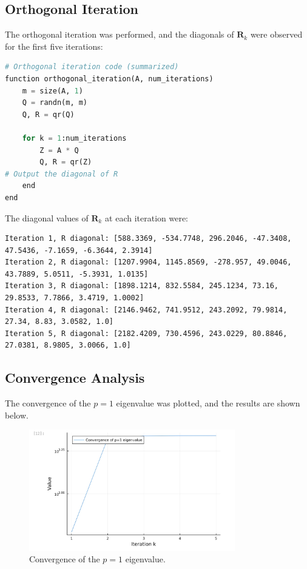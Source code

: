 \documentclass{article}
\begin{document}
\subsection{Orthogonal Iteration}
The orthogonal iteration was performed, and the diagonals of $\mathbf{R}_k$ were observed for the first five iterations:

\begin{lstlisting}[language=Python]
# Orthogonal iteration code (summarized)
function orthogonal_iteration(A, num_iterations)
    m = size(A, 1)
    Q = randn(m, m)
    Q, R = qr(Q)

    for k = 1:num_iterations
        Z = A * Q
        Q, R = qr(Z)
# Output the diagonal of R
    end
end
\end{lstlisting}

The diagonal values of $\mathbf{R}_k$ at each iteration were:

\begin{verbatim}
Iteration 1, R diagonal: [588.3369, -534.7748, 296.2046, -47.3408, 47.5436, -7.1659, -6.3644, 2.3914]
Iteration 2, R diagonal: [1207.9904, 1145.8569, -278.957, 49.0046, 43.7889, 5.0511, -5.3931, 1.0135]
Iteration 3, R diagonal: [1898.1214, 832.5584, 245.1234, 73.16, 29.8533, 7.7866, 3.4719, 1.0002]
Iteration 4, R diagonal: [2146.9462, 741.9512, 243.2092, 79.9814, 27.34, 8.83, 3.0582, 1.0]
Iteration 5, R diagonal: [2182.4209, 730.4596, 243.0229, 80.8846, 27.0381, 8.9805, 3.0066, 1.0]
\end{verbatim}

\subsection{Convergence Analysis}
The convergence of the $p=1$ eigenvalue was plotted, and the results are shown below.

\begin{figure}[H]
    \centering
    \includegraphics[width=0.8\textwidth]{HW5 photos/Image 3-31-24 at 17.33.jpeg}
    \caption{Convergence of the $p=1$ eigenvalue.}
    \label{fig:convergence_p1}
\end{figure}
\end{document}
